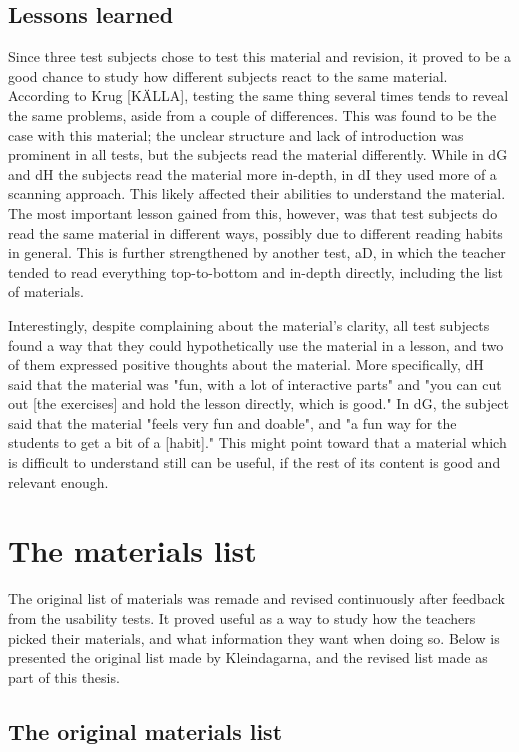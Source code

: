 \subsection{Lessons learned}

Since three test subjects chose to test this material and revision, it proved to be a good chance to study how different subjects react to the same material. According to Krug [KÄLLA], testing the same thing several times tends to reveal the same problems, aside from a couple of differences. This was found to be the case with this material; the unclear structure and lack of introduction was prominent in all tests, but the subjects read the material differently. While in dG and dH the subjects read the material more in-depth, in dI they used more of a scanning approach. This likely affected their abilities to understand the material. The most important lesson gained from this, however, was that test subjects do read the same material in different ways, possibly due to different reading habits in general. This is further strengthened by another test, aD, in which the teacher tended to read everything top-to-bottom and in-depth directly, including the list of materials.

Interestingly, despite complaining about the material's clarity, all test subjects found a way that they could hypothetically use the material in a lesson, and two of them expressed positive thoughts about the material. More specifically, dH said that the material was "fun, with a lot of interactive parts" and "you can cut out [the exercises] and hold the lesson directly, which is good." In dG, the subject said that the material "feels very fun and doable", and "a fun way for the students to get a bit of a [habit]." This might point toward that a material which is difficult to understand still can be useful, if the rest of its content is good and relevant enough.

\section{The materials list}

The original list of materials was remade and revised continuously after feedback from the usability tests. It proved useful as a way to study how the teachers picked their materials, and what information they want when doing so. Below is presented the original list made by Kleindagarna, and the revised list made as part of this thesis.

\subsection{The original materials list}

